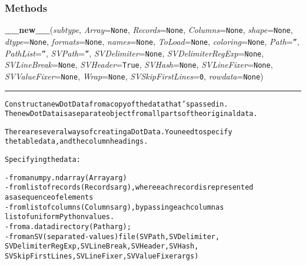 
  \subsubsection{Methods}

    \label{Classes:DotData:DotData:__new__}

    \vspace{0.5ex}

\hspace{.8\funcindent}\begin{boxedminipage}{\funcwidth}

    \raggedright \textbf{\_\_new\_\_}(\textit{subtype}, \textit{Array}={\tt None}, \textit{Records}={\tt None}, \textit{Columns}={\tt None}, \textit{shape}={\tt None}, \textit{dtype}={\tt None}, \textit{formats}={\tt None}, \textit{names}={\tt None}, \textit{ToLoad}={\tt None}, \textit{coloring}={\tt None}, \textit{Path}={\tt ''}, \textit{PathList}={\tt ''}, \textit{SVPath}={\tt ''}, \textit{SVDelimiter}={\tt None}, \textit{SVDelimiterRegExp}={\tt None}, \textit{SVLineBreak}={\tt None}, \textit{SVHeader}={\tt True}, \textit{SVHash}={\tt None}, \textit{SVLineFixer}={\tt None}, \textit{SVValueFixer}={\tt None}, \textit{Wrap}={\tt None}, \textit{SVSkipFirstLines}={\tt 0}, \textit{rowdata}={\tt None})

    \vspace{-1.5ex}

    \rule{\textwidth}{0.5\fboxrule}
\setlength{\parskip}{2ex}
\begin{alltt}
Construct a new DotData from a copy of the data that's passed in.   
     The new DotData is a separate object from all parts of the original data.

     There are several ways of creating a DotData.  You need to specify
     the table data, and the column headings.

     Specifying the data:

        - from a numpy.ndarray (Array arg)
        - from list of records (Records arg), where each record is represented
             as a sequence of elements
        - from list of columns (Columns arg), by passing each column as 
             list of uniform Python values.
        - from a .data directory (Path arg);
        - from an SV (separated-values) file (SVPath, SVDelimiter,
             SVDelimiterRegExp, SVLineBreak, SVHeader, SVHash, 
                     SVSkipFirstLines, SVLineFixer, SVValueFixer args)


\end{alltt}
\end{boxedminipage}
